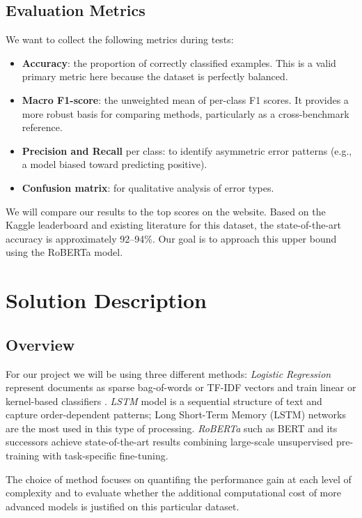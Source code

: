 \documentclass{article}
\begin{document}
\subsection{Evaluation Metrics}
We want to collect the following metrics during tests:
\begin{itemize}
  \item \textbf{Accuracy}: the proportion of correctly classified examples.
    This is a valid primary metric here because the dataset is perfectly balanced.
  \item \textbf{Macro F1-score}: the unweighted mean of per-class F1 scores.
    It provides a more robust basis for comparing methods, particularly as a
    cross-benchmark reference.
  \item \textbf{Precision and Recall} per class: to identify asymmetric error
    patterns (e.g., a model biased toward predicting positive).
  \item \textbf{Confusion matrix}: for qualitative analysis of error types.
\end{itemize} We will compare our results to the 
top scores on the website. Based on the Kaggle leaderboard and existing literature for this 
dataset, the state-of-the-art accuracy is approximately 92–94\%. Our goal is to approach 
this upper bound using the RoBERTa model.

\section{Solution Description}

\subsection{Overview}

For our project we will be using three different methods:
\textit{Logistic Regression} represent documents as sparse
bag-of-words or TF-IDF vectors and train linear or kernel-based classifiers
\cite{pang2002thumbs}.
\textit{LSTM} model is a sequential structure of text and
capture order-dependent patterns; Long Short-Term Memory (LSTM) networks are the 
most used in this type of processing.
\textit{RoBERTa} such as BERT and its successors achieve state-of-the-art results 
combining large-scale unsupervised pre-training with task-specific fine-tuning.

The choice of method focuses on quantifing the performance gain at each level of
complexity and to evaluate whether the additional computational cost of
more advanced models is justified on this particular dataset.
\end{document}
